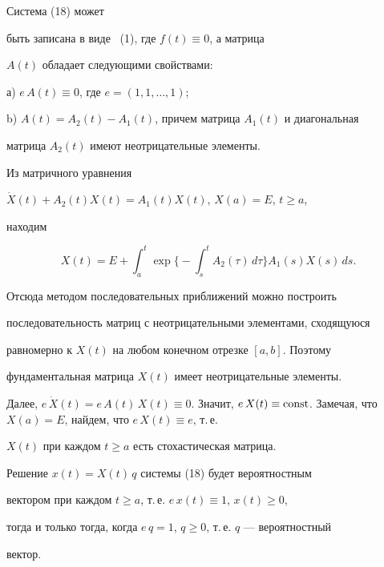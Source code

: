 \begin{pf} Система (18) может


быть записана в виде~ (1), где $f(t)\equiv 0$, а матрица


$A(t)$ обладает следующими свойствами:





а) $e\,A(t)\equiv 0$, где $e=(1,1,\dotsc,1)$;





b) $A(t)=A_2(t)-A_1(t)$, причем матрица $A_1(t)$ и диагональная


матрица $A_2(t)$ имеют неотрицательные элементы.





Из матричного уравнения


$\Dot X(t)+A_2(t)X(t)=A_1(t)X(t)$, $X(a)=E$, $t\ge a$,


находим


$$


X(t)=E+\int_a^t\exp\bigg\{-\int_s^tA_2(\tau)\,d\tau\bigg\}A_1(s)X(s)\,ds.


$$


Отсюда методом последовательных приближений можно построить


последовательность матриц с неотрицательными элементами, сходящуюся


равномерно к $X(t)$ на любом конечном отрезке $[a,b]$. Поэтому


фундаментальная матрица $X(t)$ имеет неотрицательные элементы.





Далее, $e\,\Dot X(t)=e\,A(t)\,X(t)\equiv 0$. Значит, $e\,X(t)\equiv


\const$. Замечая, что $X(a)=E$, найдем, что $e\,X(t)\equiv e$, т.\,е.


$X(t)$ при каждом $t\ge a$ есть стохастическая матрица.





Решение $x(t)=X(t)\,q$ системы (18) будет вероятностным


вектором при каждом $t\ge a$, т.\,е. $e\,x(t)\equiv 1$, $x(t)\ge 0$,


тогда и только тогда, когда $e\,q=1$, $q\ge 0$, т.\,е. $q$ --- вероятностный


вектор.






\end{pf}
